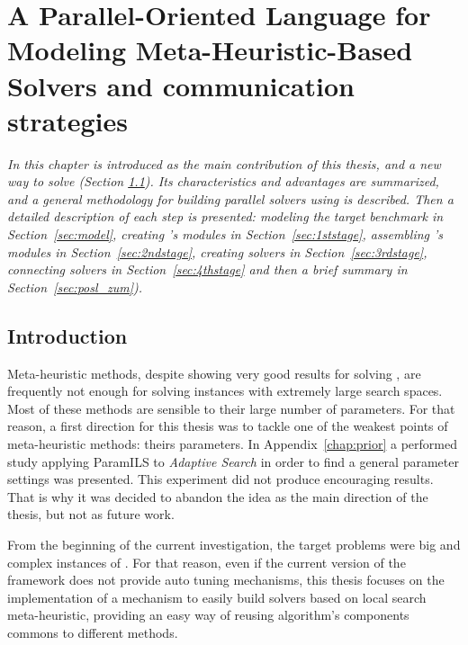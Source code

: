 \chapter{A Parallel-Oriented Language for Modeling Meta-Heuristic-Based Solvers and communication strategies}
\label{chap:posl}
\textit{In this chapter \posl{} is introduced as the main contribution of this thesis, and a new way to solve \csps{} (Section \ref{sec:posl_intro}). Its characteristics and advantages are summarized, and a general methodology for building parallel solvers using \posl{} is described. Then a detailed description of each step is presented: modeling the target benchmark in Section~\ref{sec:model}, creating \posl's modules in Section~\ref{sec:1ststage}, assembling \posl's modules in Section~\ref{sec:2ndstage}, creating \posl{} solvers in Section~\ref{sec:3rdstage}, connecting solvers in Section~\ref{sec:4thstage} and then a brief summary in Section~\ref{sec:posl_zum}).}
\vfill
\minitoc
\newpage

\section{Introduction}
\label{sec:posl_intro}

Meta-heuristic methods, despite showing very good results for solving \CSPs, are frequently not enough for solving instances with extremely large search spaces. Most of these methods are sensible to their large number of parameters. For that reason, a first direction for this thesis was to tackle one of the weakest points of meta-heuristic methods: theirs parameters. In Appendix~\ref{chap:prior} a performed study applying {\sc ParamILS} to {\it Adaptive Search} in order to find a general parameter settings was presented. This experiment did not produce encouraging results. That is why it was decided to abandon the idea as the main direction of the thesis, but not as future work.

From the beginning of the current investigation, the target problems were big and complex instances of \csps. For that reason, even if the current version of the framework does not provide auto tuning mechanisms, this thesis focuses on the implementation of a mechanism to easily build solvers based on local search meta-heuristic, providing an easy way of reusing algorithm's components commons to different methods.

